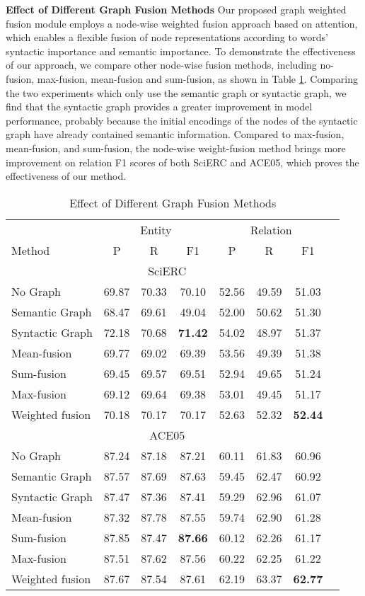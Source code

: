 \documentclass[sigconf]{acmart}
\begin{document}
\noindent\textbf{Effect of Different Graph Fusion Methods}
Our proposed graph weighted fusion module employs a node-wise weighted fusion approach based on attention, which enables a flexible fusion of node representations according to words' syntactic importance and semantic importance. To demonstrate the effectiveness of our approach, we compare other node-wise fusion methods, including no-fusion, max-fusion, mean-fusion and sum-fusion, as shown in Table \ref{tab:as_fusion}. Comparing the two experiments which only use the semantic graph or syntactic graph, we find that the syntactic graph provides a greater improvement in model performance, probably because the initial encodings of the nodes of the syntactic graph have already contained semantic information. Compared to max-fusion, mean-fusion, and sum-fusion, the node-wise weight-fusion method brings more improvement on relation F1 scores of both SciERC and ACE05, which proves the effectiveness of our method.

\begin{table}
\small
  \begin{tabular}{@{}lccccccc@{}}
  \toprule
 	& \multicolumn{3}{c}{Entity} & \multicolumn{3}{c}{Relation} \\ 
 	\cmidrule(lr){2-4} \cmidrule(lr){5-7}
 	Method & P & R & F1 & P & R & F1 \\ \midrule
 	\multicolumn{7}{c}{SciERC}\\ \midrule
 	No Graph & 69.87 & 70.33 & 70.10 & 52.56 & 49.59 & 51.03 \\
 	Semantic Graph & 68.47 & 69.61 & 49.04 & 52.00 & 50.62 & 51.30 \\
 	Syntactic Graph & 72.18 & 70.68 & \textbf{71.42} & 54.02 & 48.97 & 51.37  \\
 	Mean-fusion & 69.77 & 69.02 & 69.39 & 53.56 & 49.39 & 51.38 \\
 	Sum-fusion & 69.45 & 69.57 & 69.51 & 52.94 & 49.65 & 51.24 \\
 	Max-fusion & 69.12 & 69.64 & 69.38 & 53.01 & 49.45 & 51.17 \\
 	Weighted fusion & 70.18 & 70.17 & 70.17 & 52.63 & 52.32 & \textbf{52.44} \\ \midrule
 	\multicolumn{7}{c}{ACE05}\\ \midrule
 	No Graph & 87.24 & 87.18 & 87.21 & 60.11 & 61.83 & 60.96 \\
 	Semantic Graph & 87.57 & 87.69 & 87.63 & 59.45 & 62.47 & 60.92 \\
 	Syntactic Graph & 87.47 & 87.36 & 87.41 & 59.29 & 62.96 & 61.07  \\
    Mean-fusion & 87.32 & 87.78 & 87.55 & 59.74 & 62.90 & 61.28 \\
 	Sum-fusion & 87.85 & 87.47 & \textbf{87.66} & 60.12 & 62.26 & 61.17 \\
 	Max-fusion & 87.51 & 87.62 & 87.56 & 60.22 & 62.25 & 61.22 \\
 	Weighted fusion & 87.67 & 87.54 & 87.61 & 62.19 & 63.37 & \textbf{62.77} \\
   \bottomrule
 \end{tabular}
 \caption{Effect of Different Graph Fusion Methods}
 \label{tab:as_fusion}
\end{table}
\end{document}

